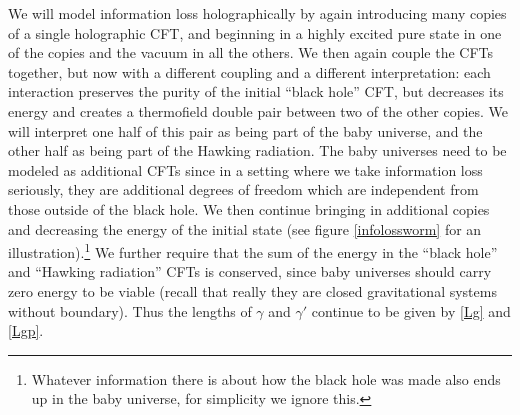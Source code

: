 \documentclass[12pt]{article}
\theoremstyle{definition}
\begin{document}
We will model information loss holographically by again introducing many copies of a single holographic CFT, and beginning in a highly excited pure state in one of the copies and the vacuum in all the others.  We then again couple the CFTs together, but now with a different coupling and a different interpretation: each interaction preserves the purity of the initial ``black hole'' CFT, but decreases its energy and creates a thermofield double pair between two of the other copies.  We will interpret one half of this pair as being part of the baby universe, and the other half as being part of the Hawking radiation.  The baby universes need to be modeled as additional CFTs since in a setting where we take information loss seriously, they are additional degrees of freedom which are independent from those outside of the black hole.  We then continue bringing in additional copies and decreasing the energy of the initial state (see figure \ref{infolossworm} for an illustration).\footnote{Whatever information there is about how the black hole was made also ends up in the baby universe, for simplicity we ignore this.} We further require that the sum of the energy in the ``black hole'' and ``Hawking radiation'' CFTs is conserved, since baby universes should carry zero energy to be viable (recall that really they are closed gravitational systems without boundary). Thus the lengths of $\gamma$ and $\gamma'$ continue to be given by \eqref{Lg} and \eqref{Lgp}.  
\end{document}
